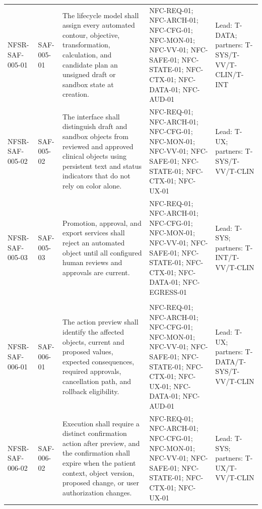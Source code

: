 \documentclass[11pt,letterpaper]{article}
\begin{document}
\begin{scriptsize}
\begin{longtable}{@{}L{0.16\textwidth}L{0.10\textwidth}L{0.31\textwidth}L{0.23\textwidth}L{0.125\textwidth}@{}}
\mbox{NFSR-SAF-005-01} & \mbox{SAF-005-01} & The lifecycle model shall assign every automated contour, objective, transformation, calculation, and candidate plan an unsigned draft or sandbox state at creation. & NFC-REQ-01; NFC-ARCH-01; NFC-CFG-01; NFC-MON-01; NFC-VV-01; NFC-SAFE-01; NFC-STATE-01; NFC-CTX-01; NFC-DATA-01; NFC-AUD-01 & Lead: T-DATA; partners: T-SYS\slash\allowbreak{}T-VV\slash\allowbreak{}T-CLIN\slash\allowbreak{}T-INT \\
\addlinespace[2pt]
\mbox{NFSR-SAF-005-02} & \mbox{SAF-005-02} & The interface shall distinguish draft and sandbox objects from reviewed and approved clinical objects using persistent text and status indicators that do not rely on color alone. & NFC-REQ-01; NFC-ARCH-01; NFC-CFG-01; NFC-MON-01; NFC-VV-01; NFC-SAFE-01; NFC-STATE-01; NFC-CTX-01; NFC-UX-01 & Lead: T-UX; partners: T-SYS\slash\allowbreak{}T-VV\slash\allowbreak{}T-CLIN \\
\addlinespace[2pt]
\mbox{NFSR-SAF-005-03} & \mbox{SAF-005-03} & Promotion, approval, and export services shall reject an automated object until all configured human reviews and approvals are current. & NFC-REQ-01; NFC-ARCH-01; NFC-CFG-01; NFC-MON-01; NFC-VV-01; NFC-SAFE-01; NFC-STATE-01; NFC-CTX-01; NFC-DATA-01; NFC-EGRESS-01 & Lead: T-SYS; partners: T-INT\slash\allowbreak{}T-VV\slash\allowbreak{}T-CLIN \\
\addlinespace[2pt]
 \\
\mbox{NFSR-SAF-006-01} & \mbox{SAF-006-01} & The action preview shall identify the affected objects, current and proposed values, expected consequences, required approvals, cancellation path, and rollback eligibility. & NFC-REQ-01; NFC-ARCH-01; NFC-CFG-01; NFC-MON-01; NFC-VV-01; NFC-SAFE-01; NFC-STATE-01; NFC-CTX-01; NFC-UX-01; NFC-DATA-01; NFC-AUD-01 & Lead: T-UX; partners: T-DATA\slash\allowbreak{}T-SYS\slash\allowbreak{}T-VV\slash\allowbreak{}T-CLIN \\
\addlinespace[2pt]
\mbox{NFSR-SAF-006-02} & \mbox{SAF-006-02} & Execution shall require a distinct confirmation action after preview, and the confirmation shall expire when the patient context, object version, proposed change, or user authorization changes. & NFC-REQ-01; NFC-ARCH-01; NFC-CFG-01; NFC-MON-01; NFC-VV-01; NFC-SAFE-01; NFC-STATE-01; NFC-CTX-01; NFC-UX-01 & Lead: T-SYS; partners: T-UX\slash\allowbreak{}T-VV\slash\allowbreak{}T-CLIN \\

\end{longtable}
\end{scriptsize}
\end{document}
